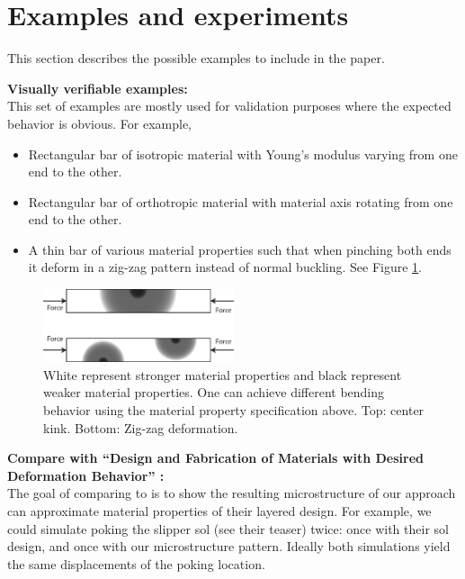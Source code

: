 \section{Examples and experiments}
\label{sec:examples}
This section describes the possible examples to include in the paper.
\begin{description}
\item{\bf Visually verifiable examples:}\\
This set of examples are mostly used for validation purposes where the expected
behavior is obvious.  For example, 
\begin{itemize}
    \item Rectangular bar of isotropic material with Young's modulus varying from one end
        to the other.
    \item Rectangular bar of orthotropic material with material axis rotating
        from one end to the other.
    \item A thin bar of various material properties such that when pinching both
    ends it deform in a zig-zag pattern instead of normal buckling. See Figure
    \ref{fig:zig_zag_bar}.
\end{itemize}
\begin{figure}
\centering
\includegraphics[width=0.5\textwidth]{images/zig_zag_bar}
\caption{White represent stronger material properties and black represent weaker
material properties.  One can achieve different bending behavior using the
material property specification above.  Top: center kink.  Bottom: Zig-zag
deformation.}
\label{fig:zig_zag_bar}
\end{figure}

\item{\bf Compare with ``Design and Fabrication of Materials with Desired
Deformation Behavior'' \cite{Bickel2010}:}\\
The goal of comparing to \cite{Bickel2010} is to show the resulting
microstructure of our approach can approximate material properties of their
layered design.  For example, we could simulate poking the slipper sol (see
their teaser) twice: once with their sol design, and once with our
microstructure pattern.  Ideally both simulations yield the same displacements
of the poking location.


\end{description}

